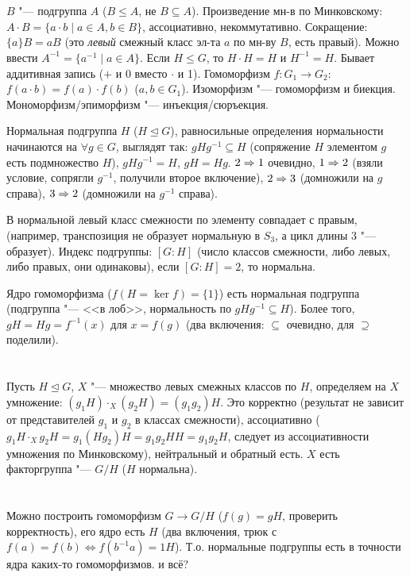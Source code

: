 \section{} %
$B$ "--- подгруппа $A$ ($B \le A$, не $B \subseteq A$).
Произведение мн-в по Минковскому: $A\cdot B=\{a \cdot b \mid a \in A, b \in B \}$, ассоциативно, некоммутативно.
Сокращение: $\{a\}B = aB$ (это \textit{левый} смежный класс эл-та $a$ по мн-ву $B$, есть правый).
Можно ввести $A^{-1}=\{a^{-1}\mid a \in A\}$.
Если $H \le G$, то $H\cdot H = H$ и $H^{-1}=H$.
Бывает аддитивная запись ($+$ и 0 вместо $\cdot$ и 1).
Гомоморфизм $f \colon G_1 \to G_2$: $f(a\cdot b) = f(a) \cdot f(b)$ ($a, b \in G_1$).
Изоморфизм "--- гомоморфизм и биекция.
Мономорфизм/эпиморфизм "--- инъекция/сюръекция.

Нормальная подгруппа $H$ ($H \unlhd G$), равносильные определения нормальности начинаются на $\forall g \in G$,
выглядят так: $gHg^{-1} \subseteq H$ (сопряжение $H$ элементом $g$ есть подмножество $H$), $gHg^{-1} = H$, $gH=Hg$.
$2\Rightarrow 1$ очевидно, $1\Rightarrow 2$ (взяли условие, сопрягли $g^{-1}$, получили второе включение),
$2 \Rightarrow 3$ (домножили на $g$ справа), $3 \Rightarrow 2$ (домножили на $g^{-1}$ справа).

В нормальной левый класс смежности по элементу совпадает с правым, (например, транспозиция не образует
нормальную в $S_3$, а цикл длины 3 "--- образует).
Индекс подгруппы: $[G:H]$ (число классов смежности, либо левых, либо правых, они одинаковы),
если $[G:H]=2$, то нормальна.

Ядро гомоморфизма ($f(H=\ker f)=\{1\}$) есть нормальная подгруппа (подгруппа "--- <<в лоб>>,
нормальность по $gHg^{-1} \subseteq H$).
Более того, $gH=Hg=f^{-1}(x)$ для $x=f(g)$ (два включения: $\subseteq$ очевидно, для $\supseteq$
поделили).

\section{} %
Пусть $H \unlhd G$, $X$ "--- множество левых смежных классов по $H$,
определяем на $X$ умножение: $(g_1H)\cdot_X(g_2H)=(g_1g_2)H$.
Это корректно (результат не зависит от представителей $g_1$ и $g_2$ в классах
смежности), ассоциативно ($g_1H\cdot_X g_2H = g_1(Hg_2)H=g_1g_2HH=g_1g_2H$,
следует из ассоциативности умножения по Минковскому), нейтральный и обратный есть.
$X$ есть факторгруппа "--- $G / H$ ($H$ нормальна).

\section{} %
Можно построить гомоморфизм $G \to G / H$ ($f(g)=gH$, проверить корректность),
его ядро есть $H$ (два включения, трюк с $f(a)=f(b) \iff f(b^{-1}a) = 1H$).
Т.о. нормальные подгруппы есть в точности ядра каких-то гомоморфизмов.
\TODO и всё?

